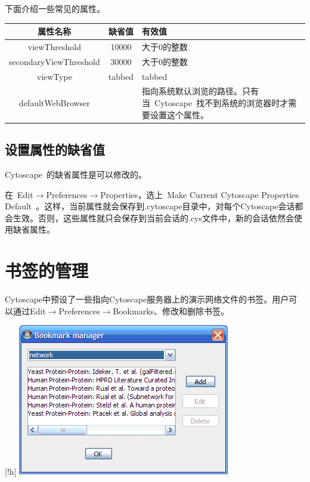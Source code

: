  下面介绍一些常见的属性。
\begin{table}[!h]
\begin{tabular}{|c|c|p{5.5cm}|}
\hline 
 \textbf{属性名称}& \textbf{缺省值}& \textbf{有效值}\\ \hline
 viewThreshold& 10000&大于0的整数\\ \hline
 secondaryViewThreshold& 30000& 大于0的整数 \\ \hline
 viewType& tabbed& tabbed \\ \hline
 defaultWebBrowser & &
 指向系统默认浏览的路径。只有当~Cytoscape~找不到系统的浏览器时才需要设置这个属性。\\
 \hline 
\end{tabular}
\end{table}

\subsection{设置属性的缺省值}
Cytoscape~的缺省属性是可以修改的。

在~Edit$\rightarrow$Preferences$\rightarrow$Properties，选上~Make Current Cytoscape Properties Default~。这样，当前属性就会保存到.cytoscape目录中，对每个Cytoscape会话都会生效。否则，这些属性就只会保存到当前会话的.cys文件中，新的会话依然会使用缺省属性。

\section{书签的管理}

 Cytoscape中预设了一些指向Cytoscape服务器上的演示网络文件的书签。用户可以通过Edit$\rightarrow$Preferences$\rightarrow$Bookmarks、修改和删除书签。 

\begin{center}[!h]
\includegraphics[width=\textwidth]{images/BookmarkManager.png} 
\end{center}


